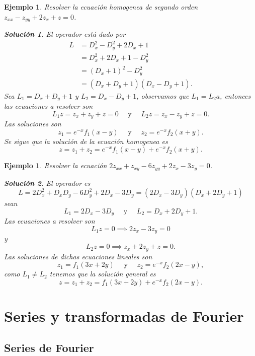 \documentclass[11pt,letterpaper]{report}
\newtheorem{example}[defn]{Ejemplo}
\newtheorem*{sol}{Solución}
\newcommand\<{\langle}
\renewcommand\>{\rangle}
\begin{document}
\begin{example}
  Resolver la ecuación homogenea de segundo orden $z_{xx} -
z_{yy} + 2z_x + z = 0$.
\begin{sol}
  El operador está dado por
  \begin{align*}
    L &= D_x^2 - D_y^2 + 2D_x + 1\\
      &= D_x^2 + 2D_x + 1 - D_y^2\\
      &= (D_x+1)^2 - D_y^2\\
      &= (D_x + D_y + 1)(D_x - D_y + 1).
  \end{align*}
  Sea $L_1 = D_x + D_y + 1$ y $L_2 = D_x - D_y + 1$,
  observamos que $L_1 = L_2a$, entonces las ecuaciones a
  resolver son
  \[
  L_1 z = z_x + z_y + z = 0 \quad \text{ y } \quad L_2 z =
  z_x - z_y + z = 0.
  \] 
  Las soluciones son
  \[
  z_1 = e^{-x}f_1(x-y) \quad \text{ y } \quad z_2 =
  e^{-x}f_2(x+y).
  \] 
  Se sigue que la solución de la ecuación homogenea es
  \[
  z = z_1 + z_2 = e^{-x}f_1(x-y) + e^{-x}f_2(x+y).
  \] 
\end{sol}
\end{example}

\begin{example}
  Resolver la ecuación $2z_{xx} + z_{xy} - 6z_{yy} + 2z_x -
  3z_y = 0$.
  \begin{sol}
    El operador es
    \[
    L = 2D_x^2 + D_xD_y - 6D_y^2 + 2D_x - 3D_y =
    (2D_x-3D_y)(D_x+2D_y+1)
    \] 
    sean
    \[
    L_1 = 2D_x - 3D_y \quad \text{ y } \quad L_2 = D_x + 2D_y
    + 1.
    \] 
    Las ecuaciones a resolver son
    \[
    L_1z = 0 \implies 2z_x - 3z_y = 0
    \] 
    y
    \[
    L_2z = 0 \implies z_x + 2z_y + z = 0.
    \] 
    Las soluciones de dichas ecuaciones lineales son
    \[
    z_1 = f_1(3x+2y) \quad \text{ y } \quad z_2 =
    e^{-x}f_2(2x-y),
    \] 
    como $L_1 \neq L_2$ tenemos que la solución general es
    \[
    z = z_1 + z_2 = f_1(3x+2y) + e^{-x}f_2(2x-y).
    \] 
  \end{sol}
\end{example}


\chapter{Series y transformadas de Fourier}

\section{Series de Fourier}
\end{document}
